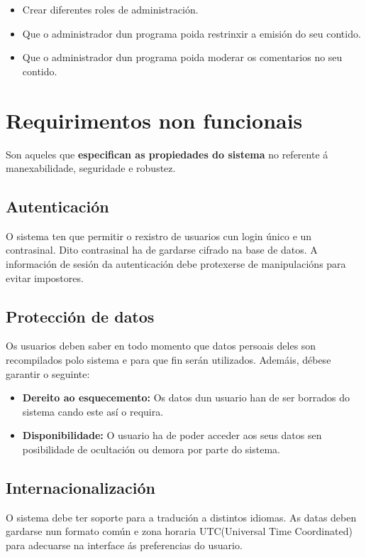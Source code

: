 \begin{itemize}
	\item Crear diferentes roles de administración.
	\item Que o administrador dun programa poida restrinxir a emisión do seu contido.
	\item Que o administrador dun programa poida moderar os comentarios no seu contido.
\end{itemize}  

\section{Requirimentos non funcionais}

Son aqueles que \textbf{especifican as propiedades do sistema} no referente á manexabilidade, seguridade e robustez\cite{softreq}.

\subsection{Autenticación}

O sistema ten que permitir o rexistro de usuarios cun login único e un contrasinal. Dito contrasinal ha de gardarse cifrado na base de datos. A información de sesión da autenticación debe protexerse de manipulacións para evitar impostores.

\subsection{Protección de datos}

Os usuarios deben saber en todo momento que datos persoais deles son recompilados polo sistema e para que fin serán utilizados. Ademáis, débese garantir o seguinte:

\begin{itemize}
	\item \textbf{Dereito ao esquecemento:} Os datos dun usuario han de ser borrados do sistema cando este así o requira.
	\item \textbf{Disponibilidade:} O usuario ha de poder acceder aos seus datos sen posibilidade de ocultación ou demora por parte do sistema. 
\end{itemize}


\subsection{Internacionalización}

O sistema debe ter soporte para a tradución a distintos idiomas. As datas deben gardarse nun formato común e zona horaria UTC(Universal Time Coordinated) para adecuarse na interface ás preferencias do usuario.

